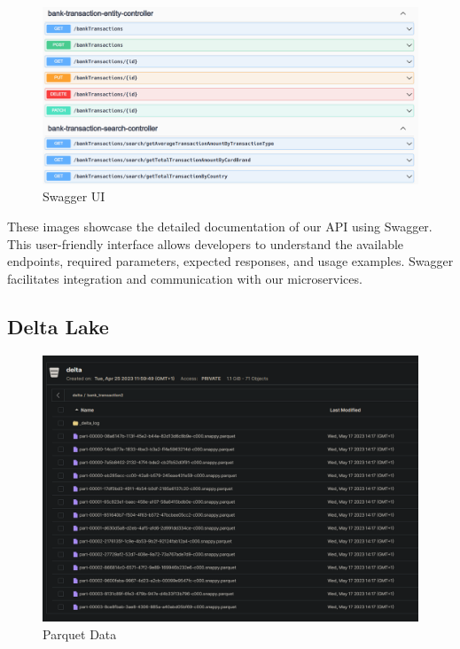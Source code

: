 \begin{figure}[H]
\centering
\includegraphics[width=\linewidth]{images/Swagger-UI-3.png}
\caption{Swagger UI}\label{fig:swagger-4}
\end{figure}

These images showcase the detailed documentation of our API using Swagger. This user-friendly interface allows developers to understand the available endpoints, required parameters, expected responses, and usage examples. Swagger facilitates integration and communication with our microservices.

\subsection{Delta Lake}

\begin{figure}[H]
\centering
\includegraphics[width=\linewidth]{images/delta-lake-dossier.png}
\caption{Parquet Data}\label{fig:delta-lake-folder}
\end{figure}

